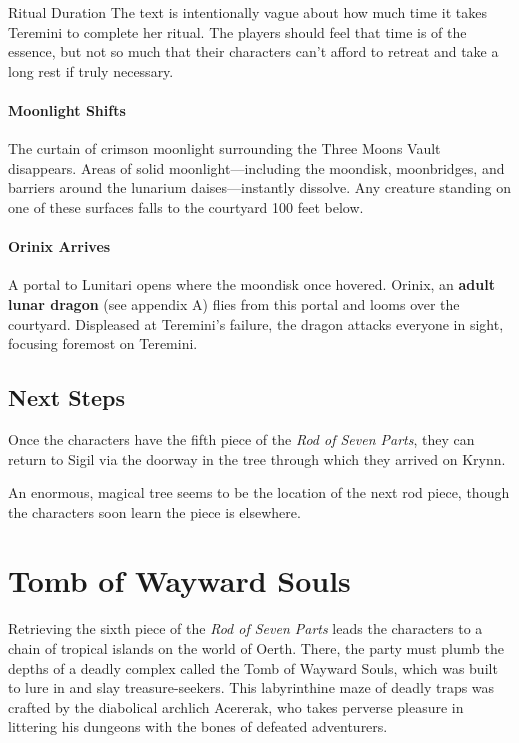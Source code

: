 \documentclass[10pt,a4paper,twoside,bg=print,twocolumn,openany,nodeprecatedcode]{dndbook}
\begin{document}
\begin{DndSidebar}[float=!b]{Ritual Duration}
The text is intentionally vague about how much time it takes Teremini to complete her ritual. The players should feel that time is of the essence, but not so much that their characters can't afford to retreat and take a long rest if truly necessary.



\end{DndSidebar}

\subsubsection{Moonlight Shifts}
The curtain of crimson moonlight surrounding the Three Moons Vault disappears. Areas of solid moonlight—including the moondisk, moonbridges, and barriers around the lunarium daises—instantly dissolve. Any creature standing on one of these surfaces falls to the courtyard 100 feet below.

\subsubsection{Orinix Arrives}
A portal to Lunitari opens where the moondisk once hovered. Orinix, an \textbf{adult lunar dragon} (see appendix A) flies from this portal and looms over the courtyard. Displeased at Teremini's failure, the dragon attacks everyone in sight, focusing foremost on Teremini.

\section{Next Steps}
Once the characters have the fifth piece of the \textit{Rod of Seven Parts}, they can return to Sigil via the doorway in the tree through which they arrived on Krynn.

An enormous, magical tree seems to be the location of the next rod piece, though the characters soon learn the piece is elsewhere.

\chapter{Tomb of Wayward Souls}
Retrieving the sixth piece of the \textit{Rod of Seven Parts} leads the characters to a chain of tropical islands on the world of Oerth. There, the party must plumb the depths of a deadly complex called the Tomb of Wayward Souls, which was built to lure in and slay treasure-seekers. This labyrinthine maze of deadly traps was crafted by the diabolical archlich Acererak, who takes perverse pleasure in littering his dungeons with the bones of defeated adventurers.
\end{document}
